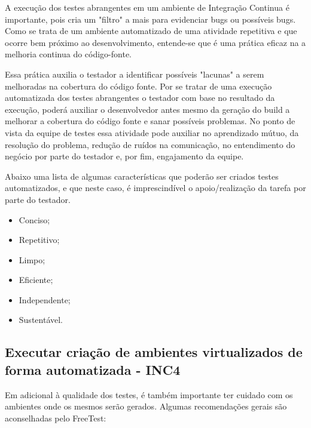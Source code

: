 A execução dos testes abrangentes em um ambiente de Integração Continua é importante, pois cria um "filtro" a mais para evidenciar bugs ou possíveis bugs. Como se trata de um ambiente automatizado de uma atividade repetitiva e que ocorre bem próximo ao desenvolvimento, entende-se que é uma prática eficaz na a melhoria continua do código-fonte.

Essa prática auxilia o testador a identificar possíveis "lacunas" a serem melhoradas na cobertura do código fonte. Por se tratar de uma execução automatizada dos testes abrangentes o testador com base no resultado da execução, poderá auxiliar o desenvolvedor antes mesmo da geração do build a melhorar a cobertura do código fonte e sanar possíveis problemas. No ponto de vista da equipe de testes essa atividade pode auxiliar no aprendizado mútuo, da resolução do problema, redução de ruídos na comunicação, no entendimento do negócio por parte do testador e, por fim, engajamento da equipe.

Abaixo uma lista de algumas características que poderão ser criados testes automatizados, e que neste caso, é imprescindível o apoio/realização da tarefa por parte do testador.

\begin{itemize}
    \item Conciso;
    \item Repetitivo;
    \item Limpo;
    \item Eficiente;
    \item Independente;
    \item Sustentável.
\end{itemize}

\subsection{Executar criação de ambientes virtualizados de forma automatizada - INC4}

Em adicional à qualidade dos testes, é também importante ter cuidado com os ambientes onde os mesmos serão gerados. Algumas recomendações gerais são aconselhadas pelo FreeTest:

